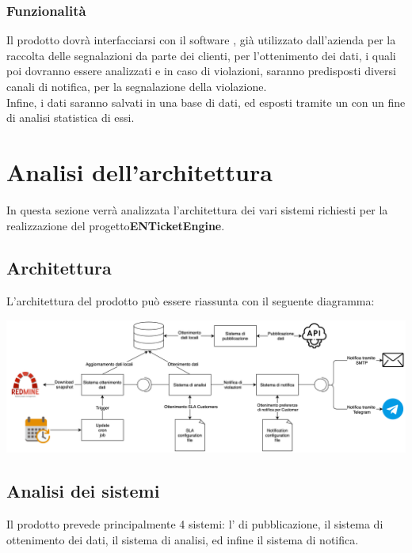 			\subsubsection{Funzionalità}
			Il prodotto dovrà interfacciarsi con il software , già utilizzato dall'azienda per la raccolta delle segnalazioni da parte dei clienti, per l'ottenimento dei dati, i quali poi dovranno essere analizzati e in caso di violazioni, saranno predisposti diversi canali di notifica, per la segnalazione della violazione.\\
			Infine, i dati saranno salvati in una base di dati, ed esposti tramite un  con un fine di analisi statistica di essi.
			\newpage

\section{Analisi dell'architettura}
In questa sezione verrà analizzata l'architettura dei vari sistemi richiesti per la realizzazione del progetto\textbf{ENTicketEngine}.\\

    \subsection{Architettura}
        L'architettura del prodotto può essere riassunta con il seguente diagramma:
        \begin{center}
            \includegraphics[keepaspectratio = true, width=15cm]{immagini/progettazione/architettura.png}
        \end{center}
        \subsection{Analisi dei sistemi}
            Il prodotto prevede principalmente 4 sistemi: l' di pubblicazione, il sistema di ottenimento dei dati, il sistema di analisi, ed infine il sistema di notifica.
